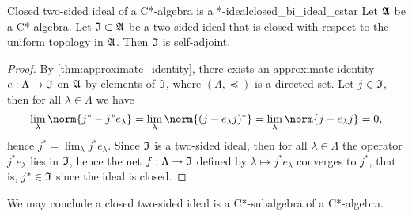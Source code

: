 \begin{proposition}{Closed two-sided ideal of a C*-algebra is a *-ideal}{closed_bi_ideal_cstar}
    Let \(\mathfrak{A}\) be a C*-algebra. Let \(\mathfrak{I} \subset \mathfrak{A}\) be a two-sided ideal that is closed with respect to the uniform topology in \(\mathfrak{A}\). Then \(\mathfrak{I}\) is self-adjoint.
\end{proposition}
\begin{proof}
    By \cref{thm:approximate_identity}, there exists an approximate identity \(e : \Lambda \to \mathfrak{I}\) on \(\mathfrak{A}\) by elements of \(\mathfrak{I}\), where \((\Lambda, \preceq)\) is a directed set. Let \(j \in \mathfrak{I}\), then for all \(\lambda \in \Lambda\) we have
    \begin{equation*}
        \lim_{\lambda}\norm{j^* - j^*e_{\lambda}} = \lim_{\lambda} \norm{(j - e_{\lambda}j)^*} = \lim_{\lambda} \norm{j - e_{\lambda}j} = 0,
    \end{equation*}
    hence \(j^* = \lim_{\lambda} j^* e_{\lambda}\). Since \(\mathfrak{I}\) is a two-sided ideal, then for all \(\lambda \in \Lambda\) the operator \(j^* e_{\lambda}\) lies in \(\mathfrak{I}\), hence the net \(f : \Lambda \to \mathfrak{I}\) defined by \(\lambda \mapsto j^* e_{\lambda}\) converges to \(j^*\), that is, \(j^* \in \mathfrak{I}\) since the ideal is closed.
\end{proof}
\begin{remark}
    We may conclude a closed two-sided ideal is a C*-subalgebra of a C*-algebra.
\end{remark}


